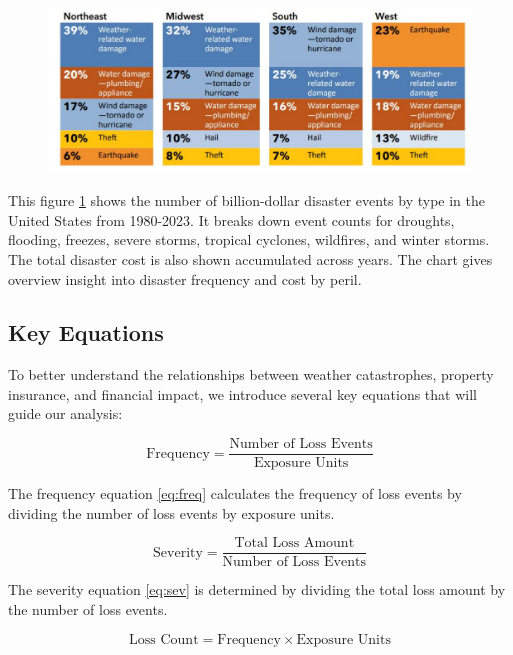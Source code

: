 \documentclass[12pt]{article}
\begin{document}
\begin{figure}[ht]
    \centering
    \includegraphics[width=0.8\linewidth]{NAIC Property Threat by Regions.pdf}
    \caption{}
    \label{fig:regional_disasters}
\end{figure}

This figure \ref{fig:regional_disasters} shows the number of billion-dollar disaster events by type in the United States from 1980-2023. It breaks down event counts 
for droughts, flooding, freezes, severe storms, tropical cyclones, wildfires, and winter storms. The total disaster cost is also shown 
accumulated across years. The chart gives overview insight into disaster frequency and cost by peril.
    
\subsection{Key Equations}

To better understand the relationships between weather catastrophes, property insurance, and financial impact, we introduce several 
key equations that will guide our analysis:

\begin{equation}
    \label{eq:freq}
    \text{Frequency} = \frac{\text{Number of Loss Events}}{\text{Exposure Units}}
\end{equation}

The frequency equation \ref{eq:freq} calculates the frequency of loss events by dividing the number of loss events by exposure units.

\begin{equation}
    \label{eq:sev}
    \text{Severity} = \frac{\text{Total Loss Amount}}{\text{Number of Loss Events}}
\end{equation}

The severity equation \ref{eq:sev} is determined by dividing the total loss amount by the number of loss events.

\begin{equation}
    \label{eq:losscount}
    \text{Loss Count} = \text{Frequency} \times \text{Exposure Units}
\end{equation}
\end{document}
